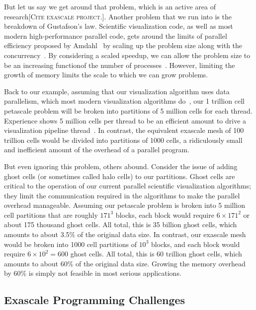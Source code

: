 \documentclass[conference]{IEEEtran}
\newcommand*{\lcite}[1]{~\cite{#1}}
\newcommand{\fix}[1]{{\color{red}\textsc{[#1]}}}
\begin{document}
But let us say we get around that problem, which is an active area of
research\fix{Cite exascale project.}.  Another problem that we run into is
the breakdown of Gustafson's law.  Scientific visualization code, as well
as most modern high-performance parallel code, gets around the limits of
parallel efficiency proposed by Amdahl\lcite{Amdahl1967} by scaling up the
problem size along with the concurrency\lcite{Gustafson1988}.  By
considering a scaled speedup, we can allow the problem size to be an
increasing functionof the number of processes\lcite{Quinn2004}.  However,
limiting the growth of memory limits the scale to which we can grow
problems.

Back to our example, assuming that our visualization algorithm uses data
parallelism, which most modern visualization algorithms
do\lcite{Moreland2012:TVCG}, our 1 trillion cell petascale problem will be
broken into partitions of 5 million cells for each thread.  Experience
shows 5 million cells per thread to be an efficient amount to drive a
visualization pipeline thread\lcite{ParaViewTutorial}.  In contrast, the
equivalent exascale mesh of 100 trillion cells would be divided into
partitions of 1000 cells, a ridiculously small and inefficient amount of
the overhead of a parallel program.

But even ignoring this problem, others abound.  Consider the issue of
adding ghost cells (or sometimes called halo cells) to our partitions.
Ghost cells are critical to the operation of our current parallel
scientific visualization algorithms; they limit the communication required
in the algorithms to make the parallel overhead manageable.  Assuming our
petascale problem is broken into 5 million cell partitions that are roughly
$171^3$ blocks, each block would require $6 \times 171^2$ or about 175
thousand ghost cells.  All total, this is 35 billion ghost cells, which
amounts to about 3.5\% of the original data size.  In contrast, our
exascale mesh would be broken into 1000 cell partitions of $10^3$ blocks,
and each block would require $6 \times 10^2 = 600$ ghost cells.  All total,
this is 60 trillion ghost cells, which amounts to about 60\% of the
original data size.  Growing the memory overhead by 60\% is simply not
feasible in most serious applications.

\subsection{Exascale Programming Challenges}

\noindent
\end{document}
